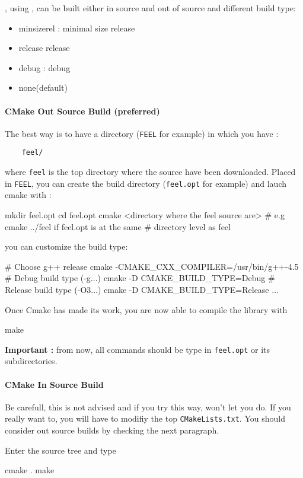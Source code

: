 \feel, using \cmake, can be built either in source and out of source and different
build type:
\begin{itemize}
\item minsizerel : minimal size release
\item release release
\item debug : debug
\item none(default)
\end{itemize}

\paragraph{CMake Out Source Build (preferred)}
The best way is to have a directory (\verb|FEEL| for example) in which you have : \\
\begin{lstlisting}
	feel/
\end{lstlisting}
where \verb|feel| is the top directory where the source have been downloaded. Placed in \verb|FEEL|, you can create the build directory (\verb|feel.opt| for example) and lauch cmake with :
\begin{unixcom}
  mkdir feel.opt
  cd feel.opt
  cmake <directory where the feel source are>
  # e.g cmake ../feel if feel.opt is at the same
  # directory level as feel
\end{unixcom}
you can customize the build type:
\begin{unixcom}
  # Choose g++ release
  cmake -CMAKE_CXX_COMPILER=/usr/bin/g++-4.5
  # Debug build type (-g...)
  cmake -D CMAKE_BUILD_TYPE=Debug
  # Release build type (-O3...)
  cmake -D CMAKE_BUILD_TYPE=Release
  ...
\end{unixcom}
Once Cmake has made its work, you are now able to compile the library with
\begin{unixcom}
		make
\end{unixcom}
\textbf{Important :} from now, all commands should be type in \verb|feel.opt| or its subdirectories.
\paragraph{CMake In Source Build}

Be carefull, this is not advised and if you try this way, \cmake won't let you do. If you really want to, you will have to modifiy the top \verb|CMakeLists.txt|. You should consider out source builds by checking the next paragraph.

Enter the source tree and type
\begin{unixcom}
  cmake .
  make
\end{unixcom}

